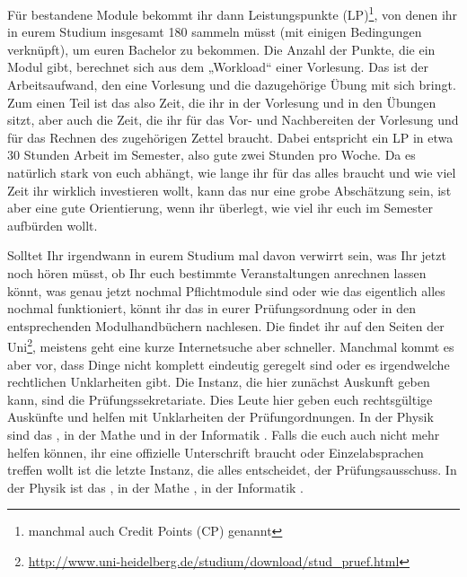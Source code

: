 Für bestandene Module bekommt ihr dann Leistungspunkte (\gls{LP})\footnote{manchmal auch Credit Points (\gls{CP}) genannt}, von denen ihr in eurem Studium insgesamt 180 sammeln müsst (mit einigen Bedingungen verknüpft), um euren Bachelor zu bekommen. Die Anzahl der Punkte, die ein Modul gibt, berechnet sich aus dem „Workload“ einer Vorlesung. Das ist der Arbeitsaufwand, den eine Vorlesung und die dazugehörige Übung mit sich bringt. Zum einen Teil ist das also Zeit, die ihr in der Vorlesung und in den Übungen sitzt, aber auch die Zeit, die ihr für das Vor- und Nachbereiten der Vorlesung und für das Rechnen des zugehörigen Zettel braucht. Dabei entspricht ein \gls{LP} in etwa 30 Stunden Arbeit im Semester, also gute zwei Stunden pro Woche. Da es natürlich stark von euch abhängt, wie lange ihr für das alles braucht und wie viel Zeit ihr wirklich investieren wollt, kann das nur eine grobe Abschätzung sein, ist aber eine gute Orientierung, wenn ihr überlegt, wie viel ihr euch im Semester aufbürden wollt.

Solltet Ihr irgendwann in eurem Studium mal davon verwirrt sein, was Ihr jetzt noch hören müsst, ob Ihr euch bestimmte Veranstaltungen anrechnen lassen könnt, was genau jetzt nochmal Pflichtmodule sind oder wie das eigentlich alles nochmal funktioniert, könnt ihr das in eurer Prüfungsordnung oder in den entsprechenden Modulhandbüchern nachlesen. Die findet ihr auf den Seiten der Uni\footnote{\url{http://www.uni-heidelberg.de/studium/download/stud_pruef.html}}, meistens geht eine kurze Internetsuche aber schneller. Manchmal kommt es aber vor, dass Dinge nicht komplett eindeutig geregelt sind oder es irgendwelche rechtlichen Unklarheiten gibt. Die Instanz, die hier zunächst Auskunft geben kann, sind die Prüfungssekretariate. Dies Leute hier geben euch rechtsgültige Auskünfte und helfen mit Unklarheiten der Prüfungordnungen. In der Physik sind das \pruefsekphysik, in der Mathe \pruefsekmathe und in der Informatik \pruefsekinfo. Falls die euch auch nicht mehr helfen können, ihr eine offizielle Unterschrift braucht oder Einzelabsprachen treffen wollt ist die letzte Instanz, die alles entscheidet, der Prüfungsausschuss. In der Physik ist das \pruefausschussvorsitzphysik, in der Mathe \pruefausschussvorsitzmathe, in der Informatik \pruefausschussvorsitzinformatik.
